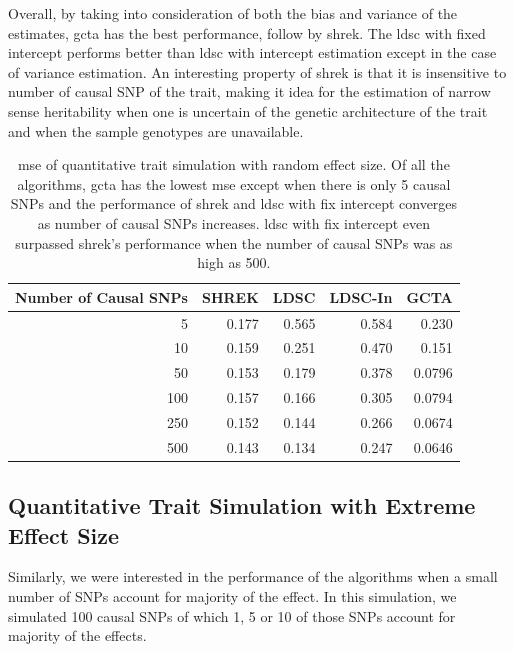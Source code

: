 		Overall, by taking into consideration of both the bias and variance of the estimates, \gls{gcta} has the best performance, follow by \gls{shrek}. 
		The \gls{ldsc} with fixed intercept performs better than \gls{ldsc} with intercept estimation except in the case of variance estimation. 
		An interesting property of \gls{shrek} is that it is insensitive to number of causal \gls{SNP} of the trait, making it idea for the estimation of narrow sense heritability when one is uncertain of the genetic architecture of the trait and when the sample genotypes are unavailable.
		\begin{table}
			\centering
			\begin{tabular}{rrrrr}
				\toprule
				Number of Causal SNPs&	SHREK&	LDSC&	LDSC-In&	GCTA \\
				\midrule
				5	&	0.177	&	0.565	&	0.584	&	0.230\\
				10	&	0.159	&	0.251	&	0.470	&	0.151\\
				50	&	0.153	&	0.179	&	0.378	&	0.0796\\
				100	&	0.157	&	0.166	&	0.305	&	0.0794\\
				250	&	0.152	&	0.144	&	0.266	&	0.0674\\
				500	&	0.143	&	0.134	&	0.247	&	0.0646\\
				\bottomrule
			\end{tabular}
			\caption[Mean Squared Error of Quantitative Trait Simulation with Random Effect Size]{
				\gls{mse} of quantitative trait simulation with random effect size.
				Of all the algorithms, \gls{gcta} has the lowest \gls{mse} except when there is only 5 causal \glspl{SNP} and the performance of \gls{shrek} and \gls{ldsc} with fix intercept converges as number of causal \glspl{SNP} increases. 
				\gls{ldsc} with fix intercept even surpassed \gls{shrek}'s performance when the number of causal \glspl{SNP} was as high as 500.}
			\label{tab:mseQtRandom}
		\end{table}
		
		\subsection{Quantitative Trait Simulation with Extreme Effect Size}
		
		Similarly, we were interested in the performance of the algorithms when a small number of \glspl{SNP} account for majority of the effect. 
		In this simulation, we simulated 100 causal \glspl{SNP} of which 1, 5 or 10 of those \glspl{SNP} account for majority of the effects.
		
